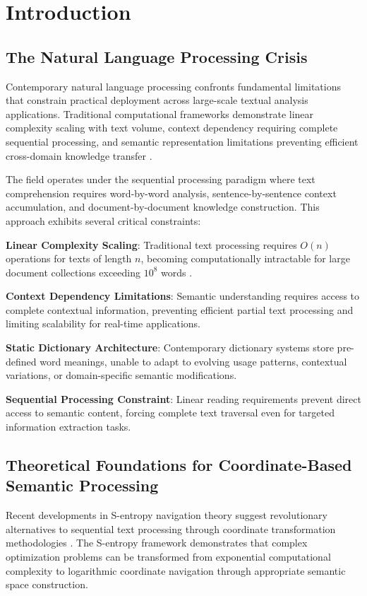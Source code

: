 \documentclass[12pt,a4paper]{article}
\begin{document}
\section{Introduction}

\subsection{The Natural Language Processing Crisis}

Contemporary natural language processing confronts fundamental limitations that constrain practical deployment across large-scale textual analysis applications. Traditional computational frameworks demonstrate linear complexity scaling with text volume, context dependency requiring complete sequential processing, and semantic representation limitations preventing efficient cross-domain knowledge transfer \cite{manning2020natural, jurafsky2014speech}.

The field operates under the sequential processing paradigm where text comprehension requires word-by-word analysis, sentence-by-sentence context accumulation, and document-by-document knowledge construction. This approach exhibits several critical constraints:

\textbf{Linear Complexity Scaling}: Traditional text processing requires $O(n)$ operations for texts of length $n$, becoming computationally intractable for large document collections exceeding $10^8$ words \cite{church2017word2vec}.

\textbf{Context Dependency Limitations}: Semantic understanding requires access to complete contextual information, preventing efficient partial text processing and limiting scalability for real-time applications.

\textbf{Static Dictionary Architecture}: Contemporary dictionary systems store pre-defined word meanings, unable to adapt to evolving usage patterns, contextual variations, or domain-specific semantic modifications.

\textbf{Sequential Processing Constraint}: Linear reading requirements prevent direct access to semantic content, forcing complete text traversal even for targeted information extraction tasks.

\subsection{Theoretical Foundations for Coordinate-Based Semantic Processing}

Recent developments in S-entropy navigation theory suggest revolutionary alternatives to sequential text processing through coordinate transformation methodologies \cite{cover2006elements}. The S-entropy framework demonstrates that complex optimization problems can be transformed from exponential computational complexity to logarithmic coordinate navigation through appropriate semantic space construction.
\end{document}
